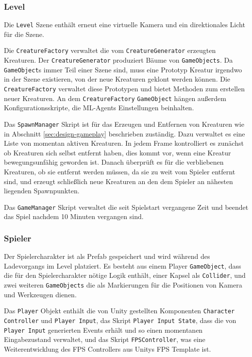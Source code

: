 \subsubsection{Level}
Die \texttt{Level} Szene enthält erneut eine virtuelle Kamera und ein direktionales Licht für die Szene.

Die \texttt{CreatureFactory} verwaltet die vom \texttt{CreatureGenerator} erzeugten Kreaturen.
Der \texttt{CreatureGenerator} produziert Bäume von \texttt{GameObjects}.
Da \texttt{GameObject}s immer Teil einer Szene sind, muss eine Prototyp Kreatur irgendwo in der Szene existieren, von der neue Kreaturen geklont werden können.
Die \texttt{CreatureFactory} verwaltet diese Prototypen und bietet Methoden zum erstellen neuer Kreaturen.
An dem \texttt{CreatureFactory} \texttt{GameObject} hängen außerdem Konfigurationsskripte, die ML-Agents Einstellungen beinhalten.

Das \texttt{SpawnManager} Skript ist für das Erzeugen und Entfernen von Kreaturen wie in Abschnitt \ref{sec:design-gameplay} beschrieben zuständig.
Dazu verwaltet es eine Liste von momentan aktiven Kreaturen.
In jedem Frame kontrolliert es zunächst ob Kreaturen sich selbst entfernt haben, dies kommt vor, wenn eine Kreatur bewegungsunfähig geworden ist.
Danach überprüft es für die verbliebenen Kreaturen, ob sie entfernt werden müssen, da sie zu weit vom Spieler entfernt sind, und erzeugt schließlich neue Kreaturen an den dem Spieler an nähesten liegenden Spawnpunkten.

Das \texttt{GameManager} Skript verwaltet die seit Spielstart vergangene Zeit und beendet das Spiel nachdem 10 Minuten vergangen sind.

\subsubsection{Spieler}
Der Spielercharakter ist als Prefab gespeichert und wird während des Ladevorgangs im Level platziert.
Es besteht aus einem Player \texttt{GameObject}, dass die für den Spielercharakter nötige Logik enthält, einer Kapsel als \texttt{Collider}, und zwei weiteren \texttt{GameObjects} die als Markierungen für die Positionen von Kamera und Werkzeugen dienen.

Das \texttt{Player} Objekt enthält die von Unity gestellten Komponenten \texttt{Character Controller} und \texttt{Player Input}, das Skript \texttt{Player Input State}, dass die von \texttt{Player Input} generierten Events erhält und so einen momentanen Eingabezustand verwaltet, und das Skript \texttt{FPSController}, was eine Weiterentwicklung des FPS Controllers aus Unitys FPS Template ist.

